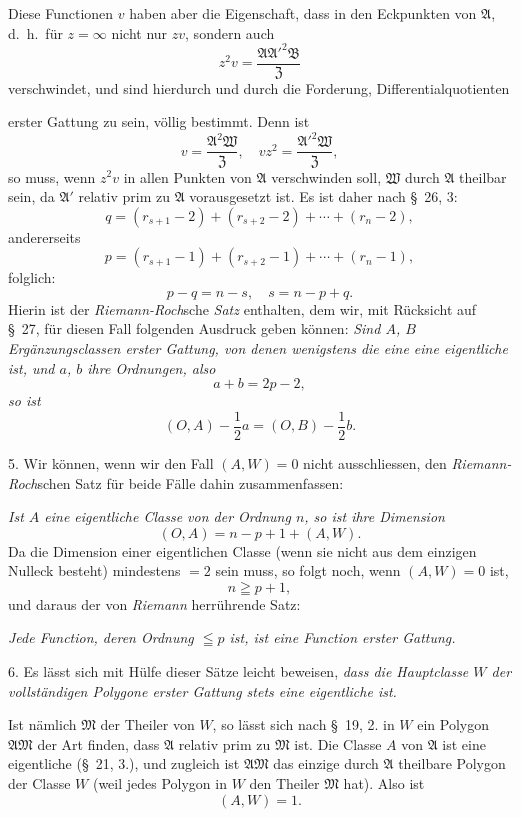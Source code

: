 \documentclass{article}
\begin{document}
Diese Functionen $v$ haben aber die Eigenschaft, dass in den Eckpunkten von $\mathfrak{A}$, d.\ h.\ für $z = \infty$ nicht nur $zv$, sondern auch
\[ z^{2}v = \frac{\mathfrak{A}\mathfrak{A}'^{2}\mathfrak{B}}{\mathfrak{Z}} \]
verschwindet, und sind hierdurch und durch die Forderung, Differentialquotienten

erster Gattung zu sein, völlig bestimmt. Denn ist
\[ v = \frac{\mathfrak{A}^{2}\mathfrak{W}}{\mathfrak{Z}}, \quad vz^{2} = \frac{\mathfrak{A}'^{2}\mathfrak{W}}{\mathfrak{Z}}, \]
so muss, wenn $z^{2}v$ in allen Punkten von $\mathfrak{A}$ verschwinden soll, $\mathfrak{W}$ durch $\mathfrak{A}$ theilbar sein, da $\mathfrak{A}'$ relativ prim zu $\mathfrak{A}$ vorausgesetzt ist. Es ist daher nach §~26, 3:
\[ q = (r_{s+1}-2)+(r_{s+2}-2)+\cdots+(r_{n}-2), \]
andererseits
\[ p = (r_{s+1}-1)+(r_{s+2}-1)+\cdots+(r_{n}-1), \]
folglich:
\[ p-q = n-s, \quad s = n-p+q. \]
Hierin ist der \emph{Riemann-Roch}sche \emph{Satz} enthalten, dem wir, mit Rücksicht auf §~27, für diesen Fall folgenden Ausdruck geben können: \emph{Sind $A$, $B$ Ergänzungsclassen erster Gattung, von denen wenigstens die eine eine eigentliche ist, und $a$, $b$ ihre Ordnungen, also}
\[ a+b = 2p-2, \]
\emph{so ist}
\[ (O, A)-\frac{1}{2}a = (O, B)-\frac{1}{2}b. \]

5. Wir können, wenn wir den Fall $(A, W) = 0$ nicht ausschliessen, den \emph{Riemann-Roch}schen Satz für beide Fälle dahin zusammenfassen:

\emph{Ist $A$ eine eigentliche Classe von der Ordnung $n$, so ist ihre Dimension}
\[ (O, A) = n-p+1+(A, W). \]
Da die Dimension einer eigentlichen Classe (wenn sie nicht aus dem einzigen Nulleck besteht) mindestens $= 2$ sein muss, so folgt noch, wenn $(A, W) = 0$ ist,
\[ n \geqq p+1, \]
und daraus der von \emph{Riemann} herrührende Satz:

\emph{Jede Function, deren Ordnung $\leqq p$ ist, ist eine Function erster Gattung.}

6. Es lässt sich mit Hülfe dieser Sätze leicht beweisen, \emph{dass die Hauptclasse $W$ der vollständigen Polygone erster Gattung stets eine eigentliche ist.}

Ist nämlich $\mathfrak{M}$ der Theiler von $W$, so lässt sich nach §~19, 2. in $W$ ein Polygon $\mathfrak{A}\mathfrak{M}$ der Art finden, dass $\mathfrak{A}$ relativ prim zu $\mathfrak{M}$ ist. Die Classe $A$ von $\mathfrak{A}$ ist eine eigentliche (§~21, 3.), und zugleich ist $\mathfrak{A}\mathfrak{M}$ das einzige durch $\mathfrak{A}$ theilbare Polygon der Classe $W$ (weil jedes Polygon in $W$ den Theiler $\mathfrak{M}$ hat). Also ist
\[ (A, W) = 1. \]
\end{document}
